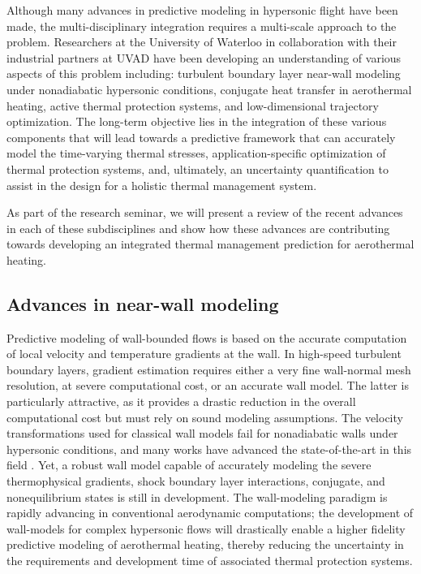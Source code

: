 \documentclass [11pt, fancyhdr, twoside] {article}
\begin{document}
Although many advances in predictive modeling in hypersonic flight have been made, the multi-disciplinary integration requires a multi-scale approach to the problem. Researchers at the University of Waterloo in collaboration with their industrial partners at UVAD have been developing an understanding of various aspects of this problem including: turbulent boundary layer near-wall modeling under nonadiabatic hypersonic conditions, conjugate heat transfer in aerothermal heating, active thermal protection systems, and low-dimensional trajectory optimization. The long-term objective lies in the integration of these various components that will lead towards a  predictive framework that can accurately model the time-varying thermal stresses, application-specific optimization of thermal protection systems, and, ultimately, an uncertainty quantification  to assist in the design for a holistic thermal management system.


As part of the research seminar, we will present a review of the recent advances in each of these subdisciplines and show how these advances are contributing towards developing an integrated thermal management prediction for aerothermal heating.



\subsection{Advances in near-wall modeling}
Predictive modeling of wall-bounded flows is based on the accurate computation of local velocity and temperature gradients at the wall. In high-speed turbulent boundary layers, gradient estimation requires either a very fine wall-normal mesh resolution, at severe computational cost, or an accurate wall model. The latter is particularly attractive, as it provides a drastic reduction in the overall computational cost but must rely on sound modeling assumptions. The velocity transformations used for classical wall models fail for nonadiabatic walls under hypersonic conditions, and many works have advanced the state-of-the-art in this field \citep{Griffin_Fu_Moin_2021,Younes_2021,Younes_Hickey_2023}. Yet, a robust wall model capable of accurately modeling the severe thermophysical gradients, shock boundary layer interactions, conjugate, and nonequilibrium states is still in development. The wall-modeling paradigm is rapidly advancing in conventional aerodynamic computations; the development of wall-models for complex hypersonic flows will drastically enable a higher fidelity predictive modeling of aerothermal heating, thereby reducing the uncertainty in the requirements and development time of associated thermal protection systems. 
\end{document}
